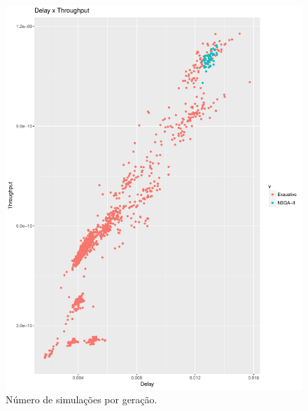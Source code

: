 \documentclass[conference]{IEEEtran}
\begin{document}
\begin{figure}[h]
  \centering
  \includegraphics[scale=0.30]{figures/ExaustivoXNsgaii_DelayXThroughput.pdf}
  \caption{Número de simulações por geração.}
  \label{fig:result-sim}
\end{figure}
\end{document}

